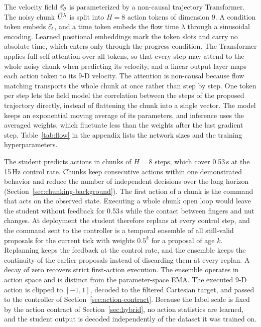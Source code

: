 The velocity field $\vec{v}_{\theta}$ is parameterized by a non-causal trajectory Transformer. The noisy chunk $\vec{U}^{\lambda}$ is split into $H=8$ action tokens of dimension 9. A condition token embeds $\vec{c}_t$, and a time token embeds the flow time $\lambda$ through a sinusoidal encoding. Learned positional embeddings mark the token slots and carry no absolute time, which enters only through the progress condition. The Transformer applies full self-attention over all tokens, so that every step may attend to the whole noisy chunk when predicting its velocity, and a linear output layer maps each action token to its 9-D velocity. The attention is non-causal because flow matching transports the whole chunk at once rather than step by step. One token per step lets the field model the correlation between the steps of the proposed trajectory directly, instead of flattening the chunk into a single vector. The model keeps an exponential moving average of its parameters, and inference uses the averaged weights, which fluctuate less than the weights after the last gradient step. Table~\ref{tab:flow} in the appendix lists the network sizes and the training hyperparameters.

The student predicts actions in chunks of $H=8$ steps, which cover 0.53\,s at the 15\,Hz control rate. Chunks keep consecutive actions within one demonstrated behavior and reduce the number of independent decisions over the long horizon (Section~\ref{sec:chunking-background}). The first action of a chunk is the command that acts on the observed state. Executing a whole chunk open loop would leave the student without feedback for 0.53\,s while the contact between fingers and nut changes. At deployment the student therefore replans at every control step, and the command sent to the controller is a temporal ensemble of all still-valid proposals for the current tick with weights $0.5^{k}$ for a proposal of age $k$. Replanning keeps the feedback at the control rate, and the ensemble keeps the continuity of the earlier proposals instead of discarding them at every replan. A decay of zero recovers strict first-action execution. The ensemble operates in action space and is distinct from the parameter-space \acs{EMA}. The executed 9-D action is clipped to $[-1,1]$, decoded to the filtered Cartesian target, and passed to the controller of Section~\ref{sec:action-contract}. Because the label scale is fixed by the action contract of Section~\ref{sec:hybrid}, no action statistics are learned, and the student output is decoded independently of the dataset it was trained on.

